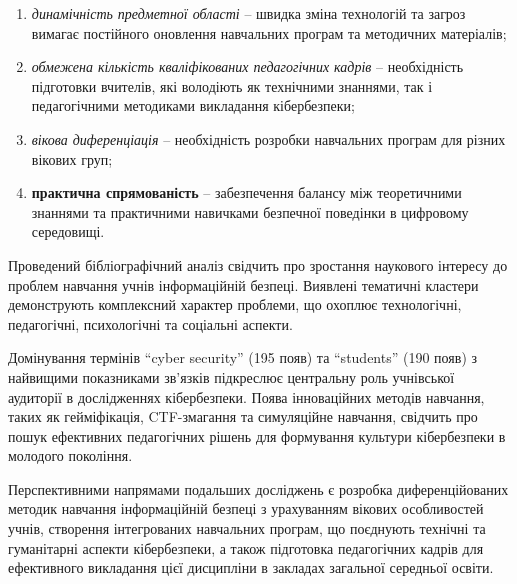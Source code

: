 \begin{enumerate}[label=--] %
    \item \textit{динамічність предметної області} -- швидка зміна технологій та загроз вимагає постійного оновлення навчальних програм та методичних матеріалів;
    
    \item \textit{обмежена кількість кваліфікованих педагогічних кадрів} -- необхідність підготовки вчителів, які володіють як технічними знаннями, так і педагогічними методиками викладання кібербезпеки;
    
    \item \textit{вікова диференціація} -- необхідність розробки навчальних програм для різних вікових груп;%
    
    \item \textbf{практична спрямованість} -- забезпечення балансу між теоретичними знаннями та практичними навичками безпечної поведінки в цифровому середовищі.
\end{enumerate}


Проведений бібліографічний аналіз свідчить про зростання наукового інтересу до проблем навчання учнів інформаційній безпеці. Виявлені тематичні кластери демонструють комплексний характер проблеми, що охоплює технологічні, педагогічні, психологічні та соціальні аспекти.

Домінування термінів ``cyber security'' (195 появ) та ``students'' (190 появ) з найвищими показниками зв'язків підкреслює центральну роль учнівської аудиторії в дослідженнях кібербезпеки. Поява інноваційних методів навчання, таких як гейміфікація, CTF-змагання та симуляційне навчання, свідчить про пошук ефективних педагогічних рішень для формування культури кібербезпеки в молодого покоління.

Перспективними напрямами подальших досліджень є розробка диференційованих методик навчання інформаційній безпеці з урахуванням вікових особливостей учнів, створення інтегрованих навчальних програм, що поєднують технічні та гуманітарні аспекти кібербезпеки, а також підготовка педагогічних кадрів для ефективного викладання цієї дисципліни в закладах загальної середньої освіти.

